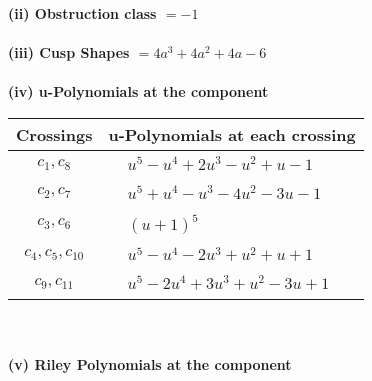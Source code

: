 \documentclass[1p]{elsarticle_modified}
\theoremstyle{definition}
\begin{document}
\flushleft \textbf{(ii) Obstruction class $= -1$}\\~\\
\flushleft \textbf{(iii) Cusp Shapes $= 4 a^3+4 a^2+4 a-6$}\\~\\
\newpage\renewcommand{\arraystretch}{1}
\flushleft \textbf{(iv) u-Polynomials at the component}\newline \\
\begin{tabular}{m{50pt}|m{274pt}}
Crossings & \hspace{64pt}u-Polynomials at each crossing \\
\hline $$\begin{aligned}c_{1},c_{8}\end{aligned}$$&$\begin{aligned}
&u^5- u^4+2 u^3- u^2+u-1
\end{aligned}$\\
\hline $$\begin{aligned}c_{2},c_{7}\end{aligned}$$&$\begin{aligned}
&u^5+u^4- u^3-4 u^2-3 u-1
\end{aligned}$\\
\hline $$\begin{aligned}c_{3},c_{6}\end{aligned}$$&$\begin{aligned}
&(u+1)^5
\end{aligned}$\\
\hline $$\begin{aligned}c_{4},c_{5},c_{10}\end{aligned}$$&$\begin{aligned}
&u^5- u^4-2 u^3+u^2+u+1
\end{aligned}$\\
\hline $$\begin{aligned}c_{9},c_{11}\end{aligned}$$&$\begin{aligned}
&u^5-2 u^4+3 u^3+u^2-3 u+1
\end{aligned}$\\
\hline
\end{tabular}\\~\\
\newpage\renewcommand{\arraystretch}{1}
\flushleft \textbf{(v) Riley Polynomials at the component}\newline \\
\end{document}
